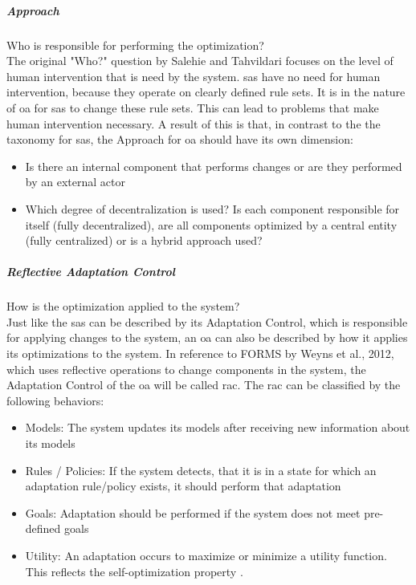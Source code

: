 \subparagraph*{Approach}
Who is responsible for performing the optimization? \\
The original "Who?" question by Salehie and Tahvildari focuses on the level of human intervention that is need by the system.
\acrshort{sas} have no need for human intervention, because they operate on clearly defined rule sets.
It is in the nature of \acrshort{oa} for \acrshort{sas} to change these rule sets.
This can lead to problems that make human intervention necessary.
A result of this is that, in contrast to the the taxonomy for \acrshort{sas}, 
the Approach for \acrshort{oa} should have its own dimension:
\begin{itemize}[nosep]
    \item Is there an internal component that performs changes or are they performed by an external actor
    \item Which degree of decentralization is used?
    Is each component responsible for itself (fully decentralized), are all components optimized by a central entity (fully centralized)
    or is a hybrid approach used?
\end{itemize}

\subparagraph*{Reflective Adaptation Control}
How is the optimization applied to the system? \\
Just like the \acrshort{sas} can be described by its Adaptation Control,
which is responsible for applying changes to the system,
an \acrshort{oa} can also be described by how it applies its optimizations to the system.
In reference to FORMS by Weyns et al., 2012\cite*{FORMS}, which uses reflective operations to change
components in the system, the Adaptation Control of the \acrshort{oa} will be called \acrshort{rac}.
The \acrshort{rac} can be classified by the following behaviors:
\begin{itemize}[nosep]
    \item Models: The system updates its models after receiving new information about its models
    \item Rules / Policies: If the system detects, that it is in a state for which an adaptation rule/policy exists,
    it should perform that adaptation
    \item Goals: Adaptation should be performed if the system does not meet pre-defined goals
    \item Utility: An adaptation occurs to maximize or minimize a utility function.
    This reflects the self-optimization property \cite*{DissectingSelfProperties}.
\end{itemize}

